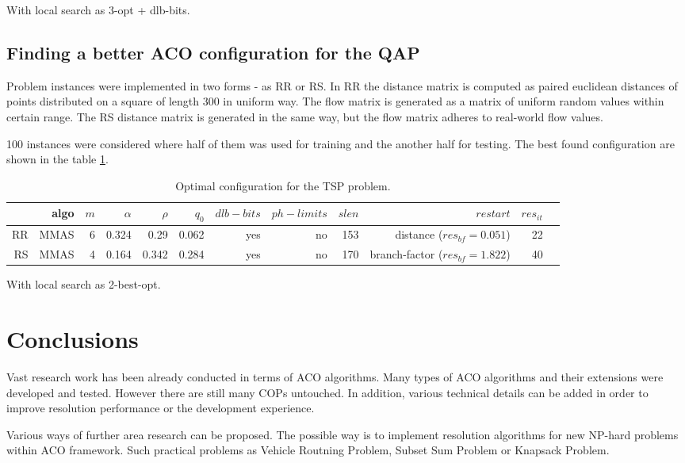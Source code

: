 \documentclass[12pt]{article}
\begin{document}
With local search as 3-opt + dlb-bits.

\subsection{Finding a better ACO configuration for the QAP}

Problem instances were implemented in two forms - as RR or RS. In RR the distance matrix is computed as paired euclidean distances of points distributed on a square of length 300 in uniform way. The flow matrix is generated as a matrix of uniform random values within certain range. The RS distance matrix is generated in the same way, but the flow matrix adheres to real-world flow values.

100 instances were considered where half of them was used for training and the another half for testing. The best found configuration are shown in the table \ref{table:table-qap}.

\begin{table}[ht]
\centering
\resizebox{\textwidth}{!}
{
\begin{tabular}{|r|r|r|r|r|r|r|r|r|r|r|r|}
  \hline 
    & algo & $m$ & $\alpha$ & $\rho$ & $q_0$ & $dlb-bits$ & $ph-limits$ & $slen$ & $restart$ & $res_{it}$\\ \hline
    RR & MMAS & 6 & 0.324 & 0.29 & 0.062 & yes & no & 153 & distance ($res_{bf} = 0.051$) & 22\\ \hline
	RS & MMAS & 4 & 0.164 & 0.342 & 0.284 & yes & no & 170 & branch-factor ($res_{bf} = 1.822$) & 40\\ \hline
\end{tabular}
}
\caption{Optimal configuration for the TSP problem.}
\label{table:table-qap} 
\end{table} 

With local search as 2-best-opt.

\section{Conclusions}

Vast research work has been already conducted in terms of ACO algorithms. Many types of ACO algorithms and their extensions were developed and tested. However there are still many COPs untouched. In addition, various technical details can be added in order to improve resolution performance or the development experience. 

Various ways of further area research can be proposed. The possible way is to implement resolution algorithms for new NP-hard problems within ACO framework. Such practical problems as Vehicle Routning Problem, Subset Sum Problem or Knapsack Problem.
\end{document}
